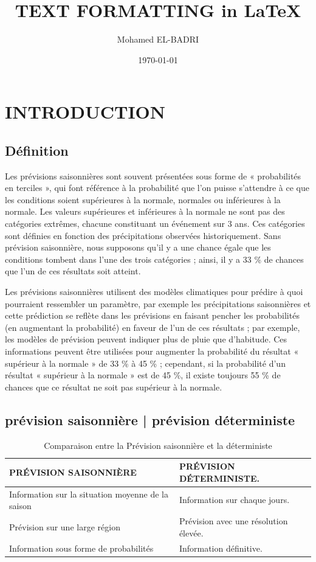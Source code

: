 \documentclass[11pt]{article}
\title{TEXT FORMATTING in \LaTeX}
\author{Mohamed EL-BADRI}
\date{\today}
\begin{document}
\section{INTRODUCTION}
	\subsection{Définition}
Les prévisions saisonnières sont souvent présentées sous forme de « probabilités en terciles », qui font référence à la
probabilité que l’on puisse s’attendre à ce que les conditions soient supérieures à la
normale, normales ou inférieures à la normale. Les valeurs supérieures et inférieures à la normale ne sont pas des catégories extrêmes, chacune constituant un événement
sur 3 ans. Ces catégories sont définies en fonction des précipitations
observées historiquement. Sans prévision saisonnière, nous supposons qu’il y a une chance égale que
les conditions tombent dans l’une des trois catégories ; ainsi, il y a 33 \% de chances que l’un de ces résultats soit atteint.


\vspace{0.3cm}


Les prévisions saisonnières utilisent des modèles climatiques pour prédire à quoi pourraient ressembler un paramètre, par exemple les précipitations saisonnières
et cette prédiction se reflète dans les prévisions en faisant pencher les probabilités
(en augmentant la probabilité) en faveur de l'un de ces résultats ; par exemple,
les modèles de prévision peuvent indiquer plus de pluie que d'habitude. Ces informations peuvent être
utilisées pour augmenter la probabilité du résultat « supérieur à la normale » de 33 \% à 45 \% ;
cependant, si la probabilité d'un résultat « supérieur à la normale » est de 45 \%, il existe toujours 55 \% de chances
que ce résultat ne soit pas supérieur à la normale.
	\subsection{prévision saisonnière | prévision déterministe}
		\begin{table}[h!]
		\centering
			\begin{tabular}{|>{\centering\arraybackslash}p{7cm}|>{\centering\arraybackslash}p{7cm}|}
				\hline
				\textbf{PRÉVISION SAISONNIÈRE} & \textbf{PRÉVISION DÉTERMINISTE}.\\ 					
				\hline
				Information sur la situation moyenne de la saison & Information sur chaque jours.\\ 
				\hline
				Prévision sur une large région & Prévision avec une résolution 					élevée.\\
				\hline
				Information sous forme de probabilités & Information définitive.\\
				\hline
			\end{tabular}
		\caption{Comparaison entre la Prévision saisonnière et la déterministe}
		\end{table}
		
\end{document}
